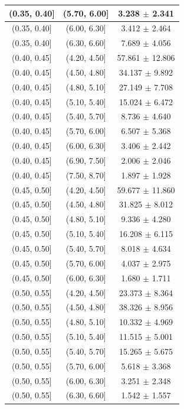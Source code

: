 \begin{longtable}{|c|c|c|}
\hline
(0.35, 0.40] & (5.70, 6.00] & 3.238 $\pm$ 2.341 \\ 
\hline
(0.35, 0.40] & (6.00, 6.30] & 3.412 $\pm$ 2.464 \\ 
\hline
(0.35, 0.40] & (6.30, 6.60] & 7.689 $\pm$ 4.056 \\ 
\hline
(0.40, 0.45] & (4.20, 4.50] & 57.861 $\pm$ 12.806 \\ 
\hline
(0.40, 0.45] & (4.50, 4.80] & 34.137 $\pm$ 9.892 \\ 
\hline
(0.40, 0.45] & (4.80, 5.10] & 27.149 $\pm$ 7.708 \\ 
\hline
(0.40, 0.45] & (5.10, 5.40] & 15.024 $\pm$ 6.472 \\ 
\hline
(0.40, 0.45] & (5.40, 5.70] & 8.736 $\pm$ 4.640 \\ 
\hline
(0.40, 0.45] & (5.70, 6.00] & 6.507 $\pm$ 5.368 \\ 
\hline
(0.40, 0.45] & (6.00, 6.30] & 3.406 $\pm$ 2.442 \\ 
\hline
(0.40, 0.45] & (6.90, 7.50] & 2.006 $\pm$ 2.046 \\ 
\hline
(0.40, 0.45] & (7.50, 8.70] & 1.897 $\pm$ 1.928 \\ 
\hline
(0.45, 0.50] & (4.20, 4.50] & 59.677 $\pm$ 11.860 \\ 
\hline
(0.45, 0.50] & (4.50, 4.80] & 31.825 $\pm$ 8.012 \\ 
\hline
(0.45, 0.50] & (4.80, 5.10] & 9.336 $\pm$ 4.280 \\ 
\hline
(0.45, 0.50] & (5.10, 5.40] & 16.208 $\pm$ 6.115 \\ 
\hline
(0.45, 0.50] & (5.40, 5.70] & 8.018 $\pm$ 4.634 \\ 
\hline
(0.45, 0.50] & (5.70, 6.00] & 4.037 $\pm$ 2.975 \\ 
\hline
(0.45, 0.50] & (6.00, 6.30] & 1.680 $\pm$ 1.711 \\ 
\hline
(0.50, 0.55] & (4.20, 4.50] & 23.373 $\pm$ 8.364 \\ 
\hline
(0.50, 0.55] & (4.50, 4.80] & 38.326 $\pm$ 8.956 \\ 
\hline
(0.50, 0.55] & (4.80, 5.10] & 10.332 $\pm$ 4.969 \\ 
\hline
(0.50, 0.55] & (5.10, 5.40] & 11.515 $\pm$ 5.001 \\ 
\hline
(0.50, 0.55] & (5.40, 5.70] & 15.265 $\pm$ 5.675 \\ 
\hline
(0.50, 0.55] & (5.70, 6.00] & 5.618 $\pm$ 3.368 \\ 
\hline
(0.50, 0.55] & (6.00, 6.30] & 3.251 $\pm$ 2.348 \\ 
\hline
(0.50, 0.55] & (6.30, 6.60] & 1.542 $\pm$ 1.557 \\ 

\end{longtable}
